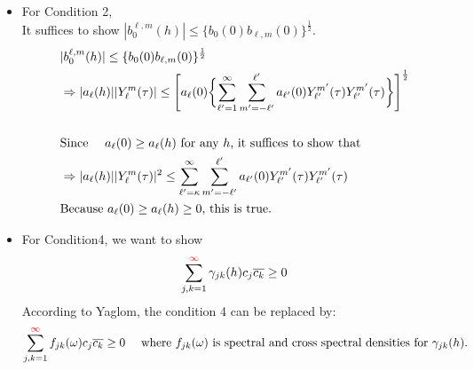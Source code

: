 \documentclass[11pt]{article}
\begin{document}
\begin{itemize}
\item
For Condition 2,\\
It suffices to show $|b_{0}^{\ell,m}(h)| \le \{b_{0}(0) b_{\ell,m}(0)\}^\frac{1}{2}$.\\
\begin{align*}
&|b_{0}^{\ell,m}(h)| \le \{b_{0}(0) b_{\ell,m}(0)\}^\frac{1}{2}\\
&\Rightarrow |a_{\ell}(h)||Y_{\ell}^{m}(\tau)| \le \Biggl[ a_{\ell}(0) \biggl\{ \sum_{{\ell}'=1}^{\infty} \sum_{m'=-\ell'}^{\ell'} a_{{\ell}'}(0) Y_{{\ell}'}^{{m}'}(\tau) Y_{{\ell}'}^{{m}'}(\tau) \biggl\} \Biggl]^\frac{1}{2}\\
\\
&\text{Since \quad $a_{\ell}(0) \ge a_{\ell}(h)$ for any $h$, it suffices to show that }\\
&\Rightarrow |a_{\ell}(h)||Y_{\ell}^{m}(\tau)|^2 \le \sum_{{\ell}'=\kappa}^{\infty} \sum_{m'=-\ell'}^{\ell'} a_{{\ell}'}(0) Y_{{\ell}'}^{{m}'}(\tau) Y_{{\ell}'}^{{m}'}(\tau)\\
&\text{Because $a_\ell(0) \ge a_\ell(h)  \ge 0$, this is true.}\\
\end{align*}

\item
For Condition4, we want to show\\
$$\sum_{j,k=1}^{{\color{red}\infty}} \gamma_{jk}(h) c_j \overline{c_k} \ge 0$$
According to Yaglom, the condition 4 can be replaced by:\\
$$\sum_{j,k=1}^{{\color{red}\infty}} f_{jk}(\omega) c_j \overline{c_k} \ge 0 \quad \text{ where } f_{jk}(\omega) \text{ is spectral and cross spectral densities for } \gamma_{jk}(h).$$


\end{itemize}
\end{document}
